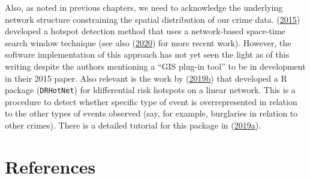 \documentclass[
  krantz2]{krantz}
\begin{document}
Also, as noted in previous chapters, we need to acknowledge the underlying network structure constraining the spatial distribution of our crime data. (\protect\hyperlink{ref-Shiode_2015}{2015}) developed a hotspot detection method that uses a network-based space-time search window technique (see also (\protect\hyperlink{ref-Shiode_2020}{2020}) for more recent work). However, the software implementation of this approach has not yet seen the light as of this writing despite the authors mentioning a ``GIS plug-in tool'' to be in development in their 2015 paper. Also relevant is the work by (\protect\hyperlink{ref-BrizRedon_2019b}{2019b}) that developed a R package (\texttt{DRHotNet}) for ldifferential risk hotspots on a linear network. This is a procedure to detect whether specific type of event is overrepresented in relation to the other types of events observed (say, for example, burglaries in relation to other crimes). There is a detailed tutorial for this package in (\protect\hyperlink{ref-BrizRedon_2019a}{2019a}).

\hypertarget{references}{%
\chapter*{References}\label{references}}
\end{document}
